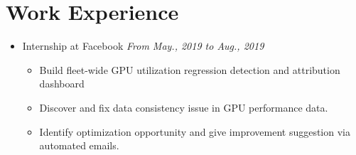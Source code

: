 \documentclass[letterpaper,11pt]{article}
\begin{document}
\section{Work Experience}
\begin{itemize}
    \item Internship at Facebook \hfill \textit{From May., 2019 to Aug., 2019}
    \begin{itemize}
        \item Build fleet-wide GPU utilization regression detection and attribution dashboard
        \item Discover and fix data consistency issue in GPU performance data.
        \item Identify optimization opportunity and give improvement suggestion via automated 
emails.
    \end{itemize}

\end{itemize}
\end{document}
